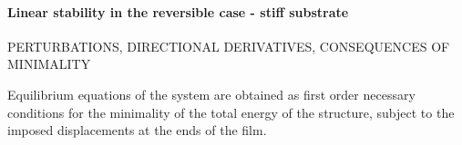 \paragraph{Linear stability in the reversible case - stiff substrate}



PERTURBATIONS, DIRECTIONAL DERIVATIVES, CONSEQUENCES OF MINIMALITY


Equilibrium equations of the system are obtained as first order necessary conditions for the minimality of the total energy of the structure, subject to the imposed displacements at the ends of the film.

